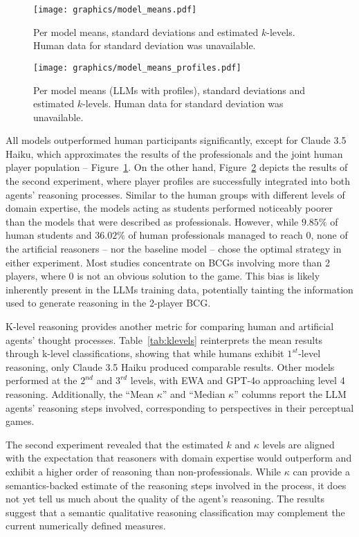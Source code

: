 \documentclass[runningheads]{llncs}
\begin{document}
\begin{figure}[htb]
    \centering
    \texttt{[image: graphics/model\_means.pdf]}
    \caption{Per model means, standard deviations and estimated $k$-levels. Human data for standard deviation was unavailable.}
    \label{fig:p2-means}
\end{figure}

\begin{figure}[htb]
    \centering
    \texttt{[image: graphics/model\_means\_profiles.pdf]}
    \caption{Per model means (LLMs with profiles), standard deviations and estimated $k$-levels. Human data for standard deviation was unavailable.}
    \label{fig:p2-means-profiled}
\end{figure}

All models outperformed human participants significantly, except for Claude 3.5 Haiku, which approximates the results of the professionals and the joint human player population -- Figure~\ref{fig:p2-means}. On the other hand, Figure~\ref{fig:p2-means-profiled} depicts the results of the second experiment, where player profiles are successfully integrated into both agents' reasoning processes. Similar to the human groups with different levels of domain expertise, the models acting as students performed noticeably poorer than the models that were described as professionals. However, while $9.85\%$ of human students and $36.02\%$ of human professionals managed to reach 0, none of the artificial reasoners -- nor the baseline model -- chose the optimal strategy in either experiment. Most studies concentrate on BCGs involving more than 2 players, where 0 is not an obvious solution to the game. This bias is likely inherently present in the LLMs training data, potentially tainting the information used to generate reasoning in the 2-player BCG.

K-level reasoning provides another metric for comparing human and artificial agents' thought processes. Table~\ref{tab:klevels} reinterprets the mean results through k-level classifications, showing that while humans exhibit $1^{st}$-level reasoning, only Claude 3.5 Haiku produced comparable results. Other models performed at the $2^{nd}$ and $3^{rd}$ levels, with EWA and GPT-4o approaching level 4 reasoning. Additionally, the ``Mean $\kappa$'' and ``Median $\kappa$'' columns report the LLM agents' reasoning steps involved, corresponding to perspectives in their perceptual games.

The second experiment revealed that the estimated $k$ and $\kappa$ levels are aligned with the expectation that reasoners with domain expertise would outperform and exhibit a higher order of reasoning than non-professionals. While $\kappa$ can provide a semantics-backed estimate of the reasoning steps involved in the process, it does not yet tell us much about the quality of the agent's reasoning. The results suggest that a semantic qualitative reasoning classification may complement the current numerically defined measures.
\end{document}
